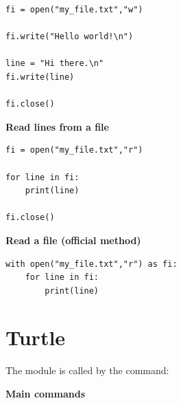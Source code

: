 \documentclass[11pt,class=report,crop=false]{standalone}
\begin{document}
\begin{lstlisting}
fi = open("my_file.txt","w")

fi.write("Hello world!\n")

line = "Hi there.\n"
fi.write(line)

fi.close()
\end{lstlisting}



\bigskip

\textbf{Read lines from a file} 

\begin{lstlisting}
fi = open("my_file.txt","r")

for line in fi:
    print(line)

fi.close()
\end{lstlisting}


\bigskip

\textbf{Read a file (official method)} 

\begin{lstlisting}
with open("my_file.txt","r") as fi: 
    for line in fi: 
        print(line) 
\end{lstlisting}


\section{Turtle}

The  module is called by the command:

\bigskip

\textbf{Main commands}
\end{document}
